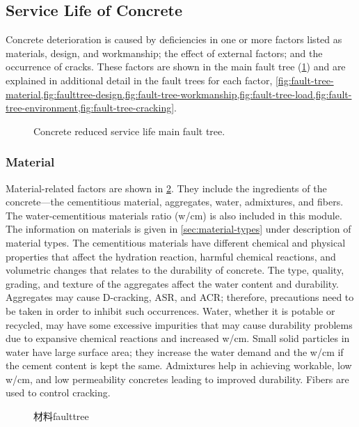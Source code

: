 \subsection{Service Life of Concrete}
Concrete deterioration is caused by deficiencies in one or more factors listed as materials, design, and workmanship; the effect of external factors; and the occurrence of cracks. These factors are shown in the main fault tree (\cref{fig:faulttree-concrete-reduced-main}) and are explained in additional detail in the fault trees for each factor, \cref{fig:fault-tree-material,fig:faulttree-design,fig:fault-tree-workmanship,fig:fault-tree-load,fig:fault-tree-environment,fig:fault-tree-cracking}.

\begin{figure}
  \caption{Concrete reduced service life main fault tree.}
  \label{fig:faulttree-concrete-reduced-main}
\end{figure}


\subsubsection{Material}
Material-related factors are shown in \cref{fig:fault-tree-material}. They include the ingredients of the concrete—the cementitious material, aggregates, water, admixtures, and fibers. The water-cementitious materials ratio (w/cm) is also included in this module. The information on materials is given in \cref{sec:material-types} under description of material types. The cementitious materials have different chemical and physical properties that affect the hydration reaction, harmful chemical reactions, and volumetric changes that relates to the durability of concrete. The type, quality, grading, and texture of the aggregates affect the water content and durability. Aggregates may cause D-cracking, ASR, and ACR; therefore, precautions need to be taken in order to inhibit such occurrences. Water, whether it is potable or recycled, may have some excessive impurities that may cause durability problems due to expansive chemical reactions and increased w/cm. Small solid particles in water have large surface area; they increase the water demand and the w/cm if the cement content is kept the same. Admixtures help in achieving workable, low w/cm, and low permeability concretes leading to improved durability. Fibers are used to control cracking.

\begin{figure}
  \caption{材料\gls*{faulttree}}
  \label{fig:fault-tree-material}
\end{figure}

